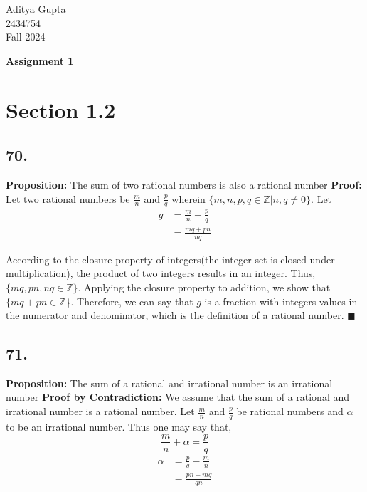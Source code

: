 \documentclass[12pt, a4paper]{article}
\newcommand{\doctitle}{Assignment 1}
\newcommand{\name}{Aditya Gupta}
\newcommand{\studentno}{2434754}
\newcommand{\todaydate}{Fall 2024}
\newcommand{\qed}[0]{$\blacksquare$}
\begin{document}
\begin{flushright}
\name \\
\studentno \\
\todaydate
\end{flushright}

\begin{center}
\Large
\bfseries
\doctitle
\end{center}

\thispagestyle{plain}

\noindent

\section*{Section 1.2}

\subsection*{70.}\bigbreak
\textbf{Proposition:} The sum of two rational numbers is also a rational number
\bigbreak
\noindent\textbf{Proof:} Let two rational numbers be $\frac{m}{n}$ and $\frac{p}{q}$ wherein $\{m,n,p,q \in \mathbb{Z} | n,q \neq 0\}$.
Let
\begin{align}
g&= \frac{m}{n} + \frac{p}{q}\\
&= \frac{mq + pn}{nq}
\end{align}

According to the closure property of integers(the integer set is closed under multiplication), the product of two integers results in an integer. Thus, $\{ mq,pn,nq \in \mathbb{Z} \}$. Applying the closure property to addition, we show that $\{ mq + pn \in \mathbb{Z}$\}. Therefore, we can say that $g$ is a fraction with integers values in the numerator and denominator, which is the definition of a rational number. 
\qed

 \subsection*{71.}\bigbreak
 \textbf{Proposition:} The sum of a rational and irrational number is an irrational number \bigbreak
 \noindent\textbf{Proof by Contradiction:} We assume that the sum of a rational and irrational number is a rational number. Let $\frac{m}{n}$ and $\frac{p}{q}$ be rational numbers and $\alpha$ to be an irrational number.
\smallbreak
 \noindent Thus one may say that,
\[
\frac{m}{n} + \alpha = \frac{p}{q}
\]
\begin{align}
\alpha &= \frac{p}{q} - \frac{m}{n}\\
&= \frac{pn - mq}{qn}
\end{align}
\end{document}
